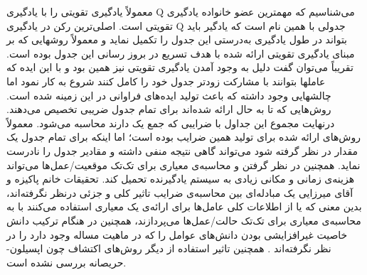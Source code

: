 \documentclass[12pt,a4paper]{article}
\begin{document}
معمولاً یادگیری تقویتی را با یادگیری Q می‌شناسیم که مهمترین عضو خانواده یادگیری تقویتی است. اصلی‌ترین رکن در
یادگیری Q جدولی با همین نام است که یادگیر باید بتواند در طول یادگیری به‌درستی این جدول را تکمیل نماید و معمولاً روشهایی
که بر مبنای یادگیری تقویتی ارائه شده با هدف تسریع در بروز رسانی این جدول بوده است. تقریباً می‌توان گفت دلیل به وجود
آمدن یادگیری تقویتی نیز همین بود و با این ایده که عاملها بتوانند با مشارکت زودتر جدول خود را کامل کنند شروع به کار نمود
اما چالشهایی وجود داشته که باعث تولید ایده‌های فراوانی در این زمینه شده است.
روش‌هایی که تا به حال ارائه‌ شده‌اند برای تمام جدول ضریبی تخصیص می‌دهند. درنهایت مجموع این جداول با ضرایبی که
جمع یک دارند محاسبه می‌شود. معمولاً روش‌های ارائه‌ شده برای تولید همین ضرایب بوده است؛ اما اینکه برای تمام جدول یک
مقدار در نظر گرفته شود می‌تواند گاهی نتیجه منفی داشته و مقادیر جدول را نادرست نماید. همچنین در نظر گرفتن و محاسبه‌ی معیاری برای تک‌تک موقعیت/عمل‌ها می‌تواند هزینه‌ی زمانی و مکانی زیادی به سیستم یادگیرنده تحمیل کند.
تحقیقات خانم پاکیزه و آقای میرزایی  یک مبادله‌ای بین محاسبه‌ی ضرایب تاثیر کلی و جزئی درنظر نگرفته‌اند، بدین معنی که یا از اطلاعات کلی عامل‌ها برای ارائه‌ی یک معیاری استفاده می‌کنند با به محاسبه‌ی معیاری برای تک‌تک حالت/عمل‌ها می‌پردازند، همچنین در هنگام ترکیب دانش خاصیت غیرافزایشی بودن دانش‌های عوامل را که در ماهیت مساله وجود دارد را در نظر نگرفته‌اند . همچنین تاثیر استفاده از دیگر روش‌های اکتشاف چون اپسیلون-حریصانه بررسی نشده است.
\end{document}
